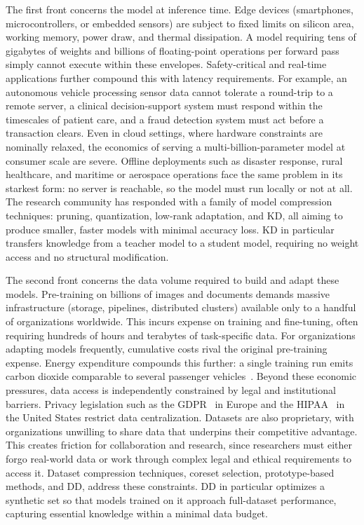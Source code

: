 \begin{foldable}
  The first front concerns the model at inference time.
  Edge devices (smartphones, microcontrollers, or embedded sensors) are subject to fixed limits on silicon area, working memory, power draw, and thermal dissipation.
  A model requiring tens of gigabytes of weights and billions of floating-point operations per forward pass simply cannot execute within these envelopes.
  Safety-critical and real-time applications further compound this with latency requirements.
  For example, an autonomous vehicle processing sensor data cannot tolerate a round-trip to a remote server, a clinical decision-support system must respond within the timescales of patient care, and a fraud detection system must act before a transaction clears.
  Even in cloud settings, where hardware constraints are nominally relaxed, the economics of serving a multi-billion-parameter model at consumer scale are severe.
  Offline deployments such as disaster response, rural healthcare, and maritime or aerospace operations face the same problem in its starkest form: no server is reachable, so the model must run locally or not at all.
  The research community has responded with a family of model compression techniques: pruning, quantization, low-rank adaptation, and \ac{KD}, all aiming to produce smaller, faster models with minimal accuracy loss.
  \ac{KD} in particular transfers knowledge from a teacher model to a student model, requiring no weight access and no structural modification.
\end{foldable}

\begin{foldable}
  The second front concerns the data volume required to build and adapt these models.
  Pre-training on billions of images and documents demands massive infrastructure (storage, pipelines, distributed clusters) available only to a handful of organizations worldwide.
  This incurs expense on training and fine-tuning, often requiring hundreds of hours and terabytes of task-specific data.
  For organizations adapting models frequently, cumulative costs rival the original pre-training expense.
  Energy expenditure compounds this further: a single training run emits carbon dioxide comparable to several passenger vehicles~\cite{strubell2019energy}.
  Beyond these economic pressures, data access is independently constrained by legal and institutional barriers.
  Privacy legislation such as the \ac{GDPR}~\cite{eu2016gdpr} in Europe and the \ac{HIPAA}~\cite{us1996hipaa} in the United States restrict data centralization.
  Datasets are also proprietary, with organizations unwilling to share data that underpins their competitive advantage.
  This creates friction for collaboration and research, since researchers must either forgo real-world data or work through complex legal and ethical requirements to access it.
  Dataset compression techniques, coreset selection, prototype-based methods, and \ac{DD}, address these constraints.
  \ac{DD} in particular optimizes a synthetic set so that models trained on it approach full-dataset performance, capturing essential knowledge within a minimal data budget.
\end{foldable}


